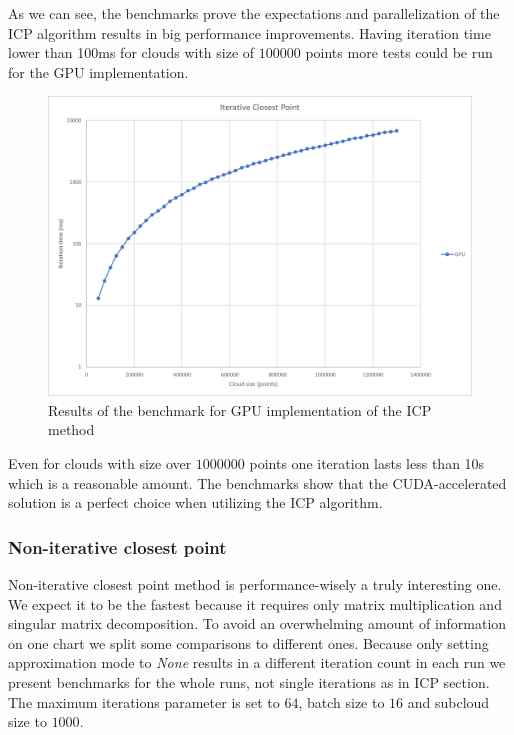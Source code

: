 \documentclass[titlepage]{article}
\begin{document}
As we can see, the benchmarks prove the expectations and parallelization of the ICP algorithm results in big performance improvements. Having iteration time lower than 100ms for clouds with size of $100000$ points more tests could be run for the GPU implementation.

\begin{figure}[H]
\includegraphics[width=\textwidth]{ms-icp-2.png}
\caption{Results of the benchmark for GPU implementation of the ICP method}
\end{figure}

Even for clouds with size over $1000000$ points one iteration lasts less than 10s which is a reasonable amount. The benchmarks show that the CUDA-accelerated solution is a perfect choice when utilizing the ICP algorithm.

\subsubsection{Non-iterative closest point}
Non-iterative closest point method is performance-wisely a truly interesting one. We expect it to be the fastest because it requires only matrix multiplication and singular matrix decomposition. To avoid an overwhelming amount of information on one chart we split some comparisons to different ones. Because only setting approximation mode to \textit{None} results in a different iteration count in each run we present benchmarks for the whole runs, not single iterations as in ICP section. The maximum iterations parameter is set to $64$, batch size to $16$ and subcloud size to $1000$.
\end{document}
